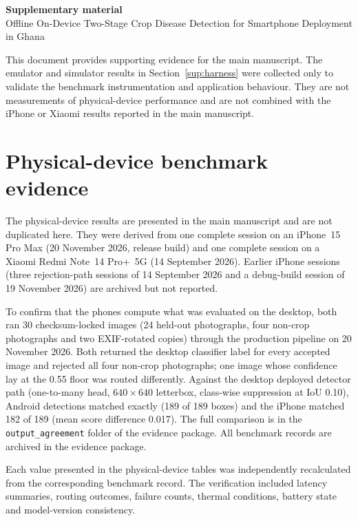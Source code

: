 \documentclass[preprint,12pt,authoryear]{elsarticle}
\begin{document}
\begin{center}
{\Large\bfseries Supplementary material}\\[4pt]
{\large Offline On-Device Two-Stage Crop Disease Detection for Smartphone
Deployment in Ghana}\\[6pt]
\end{center}

\noindent This document provides supporting evidence for the main manuscript.
The emulator and simulator results in Section~\ref{sup:harness} were collected
only to validate the benchmark instrumentation and application behaviour.
They are not measurements of physical-device performance and are not combined
with the iPhone or Xiaomi results reported in the main manuscript.

\section{Physical-device benchmark evidence}
\label{sup:physical}

The physical-device results are presented in the main manuscript and are not
duplicated here. They were derived from one complete session on an
iPhone~15 Pro Max (20 November 2026, release build) and one complete session
on a Xiaomi Redmi Note~14 Pro+~5G (14 September 2026). Earlier iPhone sessions
(three rejection-path sessions of 14 September 2026 and a debug-build session
of 19 November 2026) are archived but not reported.

To confirm that the phones compute what was evaluated on the desktop, both ran
30 checksum-locked images (24 held-out photographs, four non-crop photographs
and two EXIF-rotated copies) through the production pipeline on 20 November
2026. Both returned the desktop classifier label for every accepted image and
rejected all four non-crop photographs; one image whose confidence lay at the
0.55 floor was routed differently. Against the desktop deployed detector path
(one-to-many head, $640\times640$ letterbox, class-wise suppression at IoU
0.10), Android detections matched exactly (189 of 189 boxes) and the iPhone
matched 182 of 189 (mean score difference 0.017). The full comparison is in
the \texttt{output\_agreement} folder of the evidence package. All benchmark
records are archived in the evidence package.

Each value presented in the physical-device tables was independently
recalculated from the corresponding benchmark record. The verification
included latency summaries, routing outcomes, failure counts, thermal
conditions, battery state and model-version consistency.
\end{document}
